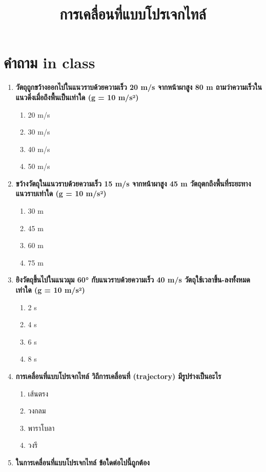 \documentclass[12pt]{article}
\begin{document}
\title{การเคลื่อนที่แบบโปรเจกไทล์}
\maketitle
\section*{คำถาม in class}
\begin{enumerate}
\def\labelenumi{\arabic*.}
\normalfont
\item \textbf{วัตถุถูกขว้างออกไปในแนวราบด้วยความเร็ว 20 m/s จากหน้าผาสูง 80 m ถามว่าความเร็วในแนวดิ่งเมื่อถึงพื้นเป็นเท่าใด (g = 10 m/s²)}
\begin{enumerate}[label=\alph*)]
\item 20 m/s
\item 30 m/s
\item 40 m/s
\item 50 m/s
\end{enumerate}
\item \textbf{ขว้างวัตถุในแนวราบด้วยความเร็ว 15 m/s จากหน้าผาสูง 45 m วัตถุตกถึงพื้นที่ระยะทางแนวราบเท่าใด (g = 10 m/s²)}
\begin{enumerate}[label=\alph*)]
\item 30 m
\item 45 m
\item 60 m
\item 75 m
\end{enumerate}
\item \textbf{ยิงวัตถุขึ้นไปในแนวมุม 60° กับแนวราบด้วยความเร็ว 40 m/s วัตถุใช้เวลาขึ้น-ลงทั้งหมดเท่าใด (g = 10 m/s²)}
\begin{enumerate}[label=\alph*)]
\item 2 s
\item 4 s
\item 6 s
\item 8 s
\end{enumerate}
\item \textbf{การเคลื่อนที่แบบโปรเจกไทล์ วิถีการเคลื่อนที่ (trajectory) มีรูปร่างเป็นอะไร}
\begin{enumerate}[label=\alph*)]
\item เส้นตรง
\item วงกลม
\item พาราโบลา
\item วงรี
\end{enumerate}
\item \textbf{ในการเคลื่อนที่แบบโปรเจกไทล์ ข้อใดต่อไปนี้ถูกต้อง}
\begin{enumerate}[label=\alph*)]

\end{enumerate}
\end{enumerate}
\end{document}
